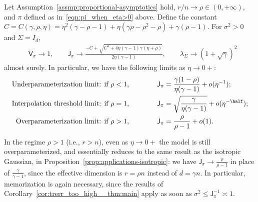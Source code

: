 \documentclass[11pt]{article}
\newcommand{\jfunc}{\mathsf{J}}
\begin{document}
\begin{proposition} \label{prop:applications-perturbed-low-rank-positive-eta} Let Assumption~\ref{assmp:proportional-asymptotics} hold, $r/n \to \rho \in (0, +\infty)$, and $\pi$ defined as in~\eqref{eqn:pi_when_eta>0} above. Define the constant $C=C(\gamma, \rho ,\eta) =\eta^2(\gamma-\rho-1)+\eta(\gamma \rho-\rho^2-\rho)+\gamma(\rho-1)$. For $\sigma^2 > 0$ and $\Sigma = I_d$,
\begin{align*}
    &\mathsf{V}_{\pi} \to 1, \qquad \jfunc_{\pi} \to \frac{-C+\sqrt{C^2+4 \eta(\gamma-1) \gamma(\eta+\rho)}}{2 \eta(\gamma-1)}, \qquad \lambda_{\Sigma} \to (1 + \sqrt{\gamma})^2
\end{align*}
almost surely.
In particular, we have the following limits as $\eta \to 0+$:
\begin{align*}
    \text{Underparameterization limit: if $\rho < 1$,} & \qquad \qquad \jfunc_{\pi} = \frac{\gamma(1-\rho)}{\eta(\gamma - 1)} + o(\eta^{-1}); \\
    \text{Interpolation threshold limit: if $\rho = 1$,} & \qquad \qquad \jfunc_{\pi} = \sqrt{\frac{\gamma}{\eta(\gamma-1)}} + o(\eta^{-\half});\\
    \text{Overparameterization limit: if $\rho > 1$,} & \qquad \qquad \jfunc_{\pi} = \frac{\rho}{\rho-1} + o(1).
\end{align*}
\end{proposition}

In the regime $\rho>1$ (i.e., $r>n$), even as $\eta\to 0+$ the model is still overparameterized, and essentially reduces to the same result as the isotropic Gaussian, in Proposition~\ref{prop:applications-isotropic}: we have $\jfunc_\pi\to\frac{\rho}{\rho-1}$ in place of $\frac{\gamma}{\gamma-1}$, since the effective dimension is $r=\rho n$ instead of $d = \gamma n$. In particular, memorization is again necessary, since the results of Corollary~\ref{cor:trerr_too_high__thm:main} apply as soon as $\sigma^2\leq\jfunc_\pi^{-1} \asymp 1$. 
\end{document}
